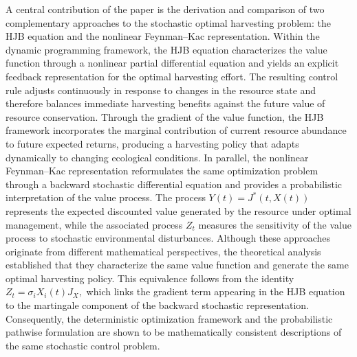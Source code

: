 \documentclass[11pt]{article}
\begin{document}
	A central contribution of the paper is the derivation and comparison of two complementary approaches to the stochastic optimal harvesting problem: the HJB equation and the nonlinear Feynman--Kac representation. Within the dynamic programming framework, the HJB equation characterizes the value function through a nonlinear partial differential equation and yields an explicit feedback representation for the optimal harvesting effort. The resulting control rule adjusts continuously in response to changes in the resource state and therefore balances immediate harvesting benefits against the future value of resource conservation. Through the gradient of the value function, the HJB framework incorporates the marginal contribution of current resource abundance to future expected returns, producing a harvesting policy that adapts dynamically to changing ecological conditions. In parallel, the nonlinear Feynman--Kac representation reformulates the same optimization problem through a backward stochastic differential equation and provides a probabilistic interpretation of the value process. The process $Y(t)=J^*(t,X(t))$ represents the expected discounted value generated by the resource under optimal management, while the associated process $Z_t$ measures the sensitivity of the value process to stochastic environmental disturbances. Although these approaches originate from different mathematical perspectives, the theoretical analysis established that they characterize the same value function and generate the same optimal harvesting policy. This equivalence follows from the identity $Z_t=\sigma_iX_i(t)J_X,$
	which links the gradient term appearing in the HJB equation to the martingale component of the backward stochastic representation. Consequently, the deterministic optimization framework and the probabilistic pathwise formulation are shown to be mathematically consistent descriptions of the same stochastic control problem.
	
\end{document}
